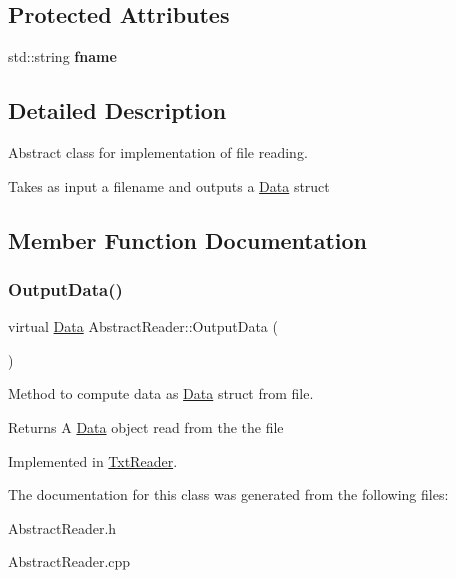 \subsection*{Protected Attributes}
\begin{DoxyCompactItemize}
\item 
\mbox{\label{class_abstract_reader_a143f9961ba8aca61c32234a042e466ce}} 
std\+::string {\bfseries fname}
\end{DoxyCompactItemize}


\subsection{Detailed Description}
Abstract class for implementation of file reading. 

Takes as input a filename and outputs a \hyperlink{struct_data}{Data} struct 

\subsection{Member Function Documentation}
\mbox{\label{class_abstract_reader_a14b05f156920be0cfa0cabdb1c6c1267}} 
\subsubsection{\texorpdfstring{Output\+Data()}{OutputData()}}
{\footnotesize\ttfamily virtual \hyperlink{struct_data}{Data} Abstract\+Reader\+::\+Output\+Data (\begin{DoxyParamCaption}{ }\end{DoxyParamCaption})\hspace{0.3cm}{\ttfamily [pure virtual]}}



Method to compute data as \hyperlink{struct_data}{Data} struct from file. 

\begin{DoxyReturn}{Returns}
A \hyperlink{struct_data}{Data} object read from the the file 
\end{DoxyReturn}


Implemented in \hyperlink{class_txt_reader_a30786dcd83c2f24dd26e83cb5fd934ab}{Txt\+Reader}.



The documentation for this class was generated from the following files\+:\begin{DoxyCompactItemize}
\item 
Abstract\+Reader.\+h\item 
Abstract\+Reader.\+cpp\end{DoxyCompactItemize}
